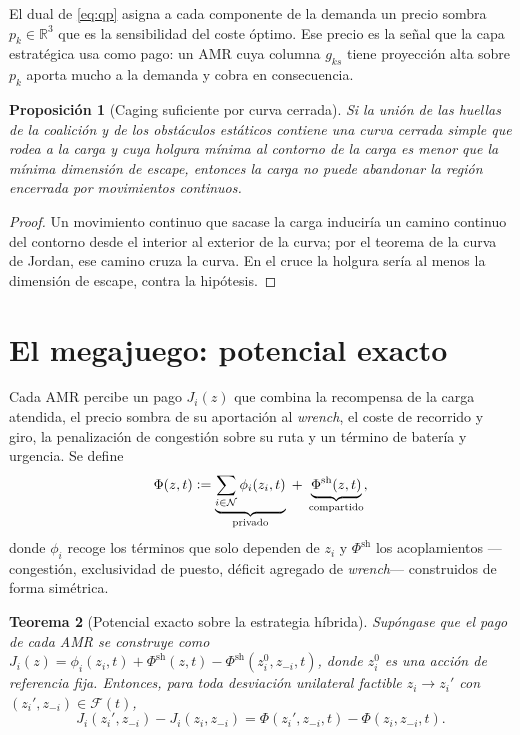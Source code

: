 \documentclass[11pt,a4paper]{article}
\theoremstyle{plain}
\newtheorem{teorema}{Teorema}[section]
\newtheorem{proposicion}[teorema]{Proposición}
\theoremstyle{definition}
\theoremstyle{remark}
\newcommand{\Rb}{\mathbb{R}}
\newcommand{\Fcal}{\mathcal{F}}
\newcommand{\Ncal}{\mathcal{N}}
\newcommand{\defeq}{\vcentcolon=}
\begin{document}
El dual de \eqref{eq:qp} asigna a cada componente de la demanda un precio
sombra $p_k\in\Rb^3$ que es la sensibilidad del coste óptimo. Ese precio es la
señal que la capa estratégica usa como pago: un AMR cuya columna $g_{ks}$ tiene
proyección alta sobre $p_k$ aporta mucho a la demanda y cobra en consecuencia.

\begin{proposicion}[Caging suficiente por curva cerrada]
\label{pr:caging}
Si la unión de las huellas de la coalición y de los obstáculos estáticos
contiene una curva cerrada simple que rodea a la carga y cuya holgura mínima al
contorno de la carga es menor que la mínima dimensión de escape, entonces la
carga no puede abandonar la región encerrada por movimientos continuos.
\end{proposicion}

\begin{proof}
Un movimiento continuo que sacase la carga induciría un camino continuo del
contorno desde el interior al exterior de la curva; por el teorema de la curva
de Jordan, ese camino cruza la curva. En el cruce la holgura sería al menos la
dimensión de escape, contra la hipótesis.
\end{proof}


\section{El megajuego: potencial exacto}
\label{sec:megajuego}

Cada AMR percibe un pago $J_i(z)$ que combina la recompensa de la carga
atendida, el precio sombra de su aportación al \emph{wrench}, el coste de
recorrido y giro, la penalización de congestión sobre su ruta y un término de
batería y urgencia. Se define
\begin{equation}
  \Phi(z,t)\defeq
  \underbrace{\sum_{i\in\Ncal}\phi_i(z_i,t)}_{\text{privado}}
  \;+\;
  \underbrace{\Phi^{\mathrm{sh}}(z,t)}_{\text{compartido}},
  \label{eq:potencial}
\end{equation}
donde $\phi_i$ recoge los términos que solo dependen de $z_i$ y
$\Phi^{\mathrm{sh}}$ los acoplamientos —congestión, exclusividad de puesto,
déficit agregado de \emph{wrench}— construidos de forma simétrica.

\begin{teorema}[Potencial exacto sobre la estrategia híbrida]
\label{th:potencial}
Supóngase que el pago de cada AMR se construye como
$J_i(z)=\phi_i(z_i,t)+\Phi^{\mathrm{sh}}(z,t)-\Phi^{\mathrm{sh}}(z_i^{0},z_{-i},t)$,
donde $z_i^{0}$ es una acción de referencia fija. Entonces, para toda
desviación unilateral factible $z_i\to z_i'$ con $(z_i',z_{-i})\in\Fcal(t)$,
\[
  J_i(z_i',z_{-i})-J_i(z_i,z_{-i})
  =\Phi(z_i',z_{-i},t)-\Phi(z_i,z_{-i},t).
\]
\end{teorema}
\end{document}
